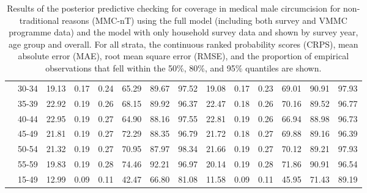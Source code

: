 \documentclass{article}
\begin{document}
\begin{appendix}
\begin{landscape}
{\begin{table}[H]
\begin{tabular}{ll ccc ccc ccc ccc}
    & 30-34 &  19.13 & 0.17 & 0.24 & 65.29 & 89.67 & 97.52 &  19.08 & 0.17 & 0.23 & 69.01 & 90.91 &  97.93 \\ 
    & 35-39 &  22.92 & 0.19 & 0.26 & 68.15 & 89.92 & 96.37 &  22.47 & 0.18 & 0.26 & 70.16 & 89.52 &  96.77 \\ 
    & 40-44 &  22.95 & 0.19 & 0.27 & 64.90 & 88.16 & 97.55 &  22.81 & 0.19 & 0.26 & 66.94 & 88.98 &  96.73 \\ 
    & 45-49 &  21.81 & 0.19 & 0.27 & 72.29 & 88.35 & 96.79 &  21.72 & 0.18 & 0.27 & 69.88 & 89.16 &  96.39 \\ 
    & 50-54 &  21.32 & 0.19 & 0.27 & 70.95 & 87.97 & 98.34 &  21.66 & 0.19 & 0.27 & 70.12 & 89.21 &  97.93 \\ 
    & 55-59 &  19.83 & 0.19 & 0.28 & 74.46 & 92.21 & 96.97 &  20.14 & 0.19 & 0.28 & 71.86 & 90.91 &  96.54 \\
    & 15-49 &  12.99 & 0.09 & 0.11 & 42.47 & 66.80 & 81.08 &  11.58 & 0.09 & 0.11 & 45.95 & 71.43 &  89.19 \\[5pt]
    \hline
    \end{tabular}
    \caption{Results of the posterior predictive checking for coverage in medical male circumcision for non-traditional reasons (MMC-nT) using the full model (including both survey and VMMC programme data) and the model with only household survey data and shown by survey year, age group and overall. For all strata, the continuous ranked probability scores (CRPS), mean absolute error (MAE), root mean square error (RMSE), and the proportion of empirical observations that fell within the 50\%, 80\%, and 95\% quantiles are shown.}
\end{table}}


\end{landscape}
\end{appendix}
\end{document}
